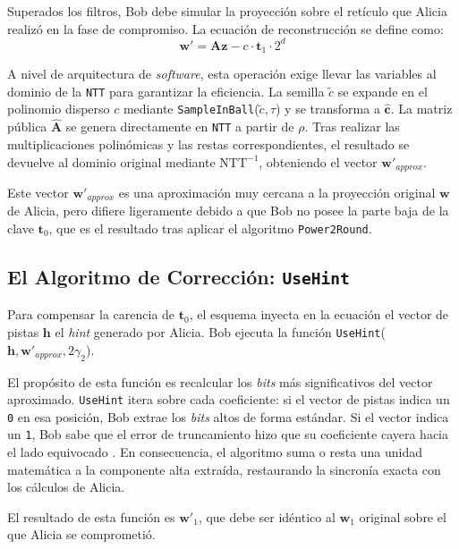 \documentclass[11pt, a4paper]{report}
\theoremstyle{definition}
\begin{document}
Superados los filtros, Bob debe simular la proyección sobre el retículo que Alicia realizó en la fase de compromiso. La ecuación de reconstrucción se define como:
\begin{equation}
    \mathbf{w}' = \mathbf{A}\mathbf{z} - c \cdot \mathbf{t}_1 \cdot 2^d
\end{equation}

A nivel de arquitectura de \textit{software}, esta operación exige llevar las variables al dominio de la \texttt{NTT} para garantizar la eficiencia. La semilla $\tilde{c}$ se expande en el polinomio disperso $c$ mediante \texttt{SampleInBall}($\tilde{c}, \tau$) y se transforma a $\mathbf{\hat{c}}$. La matriz pública $\mathbf{\hat{A}}$ se genera directamente en \texttt{NTT} a partir de $\rho$. Tras realizar las multiplicaciones polinómicas y las restas correspondientes, el resultado se devuelve al dominio original mediante $\text{NTT}^{-1}$, obteniendo el vector $\mathbf{w}'_{approx}$.

Este vector $\mathbf{w}'_{approx}$ es una aproximación muy cercana a la proyección original $\mathbf{w}$ de Alicia, pero difiere ligeramente debido a que Bob no posee la parte baja de la clave $\mathbf{t}_0$, que es el resultado tras aplicar el algoritmo \texttt{Power2Round}.

\subsection{El Algoritmo de Corrección: \texttt{UseHint}}

Para compensar la carencia de $\mathbf{t}_0$, el esquema inyecta en la ecuación el vector de pistas $\mathbf{h}$ el \textit{hint} generado por Alicia. Bob ejecuta la función \texttt{UseHint}($\mathbf{h}, \mathbf{w}'_{approx}, 2\gamma_2$).

El propósito de esta función es recalcular los \textit{bits} más significativos del vector aproximado. \texttt{UseHint} itera sobre cada coeficiente: si el vector de pistas indica un \texttt{0} en esa posición, Bob extrae los \textit{bits} altos de forma estándar. Si el vector indica un \texttt{1}, Bob sabe que el error de truncamiento hizo que su coeficiente cayera  hacia el lado equivocado . En consecuencia, el algoritmo suma o resta una unidad matemática a la componente alta extraída, restaurando la sincronía exacta con los cálculos de Alicia.

El resultado de esta función es $\mathbf{w}'_1$, que debe ser idéntico al $\mathbf{w}_1$ original sobre el que Alicia se comprometió.
\end{document}
